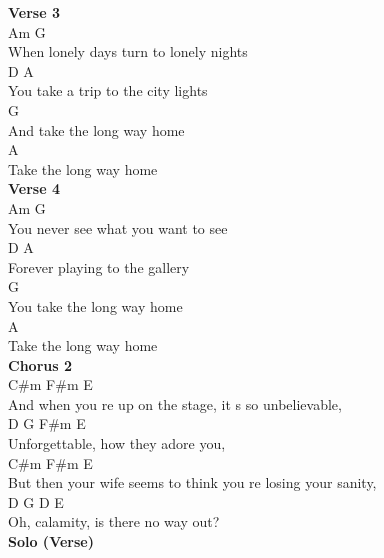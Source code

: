 \documentclass[a4paper]{article}
\begin{document}
{{        }
        \textbf{Verse 3}
        ~\\
        {
            \cutive
            \obeyspaces
Am                       G
\\
When lonely days turn to lonely nights
\\
D                      A
\\
You take a trip to the city lights
\\
             G
\\
And take the long way home
\\
         A
\\
Take the long way home
\\

        }
        \textbf{Verse 4}
        ~\\
        {
            \cutive
            \obeyspaces
Am                     G
\\
You never see what you want to see
\\
D                      A
\\
Forever playing to the gallery
\\
             G
\\
You take the long way home
\\
         A
\\
Take the long way home
\\

        }
        \textbf{Chorus 2}
        ~\\
        {
            \cutive
            \obeyspaces
C\#m                                        F\#m        E
\\
And when you re up on the stage, it s so unbelievable,
\\
     D                   G    F\#m  E
\\
Unforgettable, how they adore you,
\\
                            C\#m                      F\#m    E
\\
But then your wife seems to think you re losing your sanity,
\\
    D                  G  D   E
\\
Oh, calamity, is there no way out?
\\

        }
        \textbf{Solo (Verse)}
        ~\\
        {
            \cutive
            \obeyspaces

}}
\end{document}
